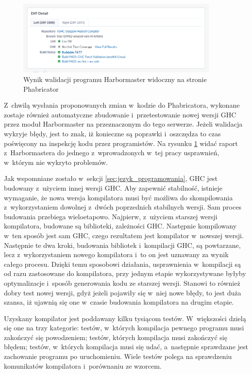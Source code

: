 \begin{figure}[ht]
    \centering
    \includegraphics[width=0.9\textwidth]{images/Phabricator_validate}
    \caption{Wynik walidacji programu Harbormaster widoczny na stronie Phabricator}
    \label{fig:Phabricator_validate}
\end{figure}

Z~chwilą wysłania proponowanych zmian w~kodzie do Phabricatora, wykonane zostaje
również automatyczne zbudowanie i~przetestowanie nowej wersji GHC przez moduł
Harbormaster na przeznaczonym do tego serwerze. Jeżeli walidacja wykryje błędy,
jest to znak, iż konieczne są poprawki i~oszczędza to czas poświęcony na
inspekcję kodu przez programistów. Na rysunku \ref{fig:Phabricator_validate}
widać raport z~Harbormastera do jednego z~wprowadzonych w~tej pracy usprawnień,
w~którym nie wykryto problemów.

Jak wspomniane zostało w~sekcji \ref{sec:jezyk_programowania}, GHC jest budowany
z~użyciem innej wersji GHC. Aby zapewnić stabilność, istnieje wymaganie, że nowa
wersja kompilatora musi być możliwa do skompilowania z~wykorzystaniem dowolnej
z~dwóch poprzednich stabilnych wersji\cite{WikiFixingBugs}. Sam proces budowania
przebiega wieloetapowo. Najpierw, z~użyciem starszej wersji kompilatora,
budowane są biblioteki, zależności GHC. Następnie kompilowany w~ten sposób jest
sam GHC, czego rezultatem jest kompilator w~nowszej wersji. Następnie te dwa
kroki, budowania bibliotek i~kompilacji GHC, są powtarzane, lecz
z~wykorzystaniem nowego kompilatora i~to on jest uznawany za wynik całego
procesu\cite{WikiBuildSystem}. Dzięki temu sposobowi działania, usprawnienia
w~kompilacji są od razu zastosowane do kompilatora, przy jednym etapie
wykorzystywane byłyby optymalizacje i~sposób generowania kodu ze starszej
wersji. Stanowi to również dobry test nowej wersji, gdyż jeżeli pojawiły się
w~niej nowe błędy, to jest duża szansa, iż ujawnią się one w~czasie budowania
kompilatora na drugim etapie.

Uzyskany kompilator jest poddawany kilku tysiącom testów. W~większości dzielą
się one na trzy kategorie: testów, w~których kompilacja pewnego programu musi
zakończyć się powodzeniem; testów, których kompilacja musi zakończyć się błędem;
testów, w~których kompilacja musi się udać, a~następnie sprawdzane jest
zachowanie programu po uruchomieniu. Wiele testów polega na sprawdzeniu
komunikatów kompilatora i~porównaniu ze wzorcem.
